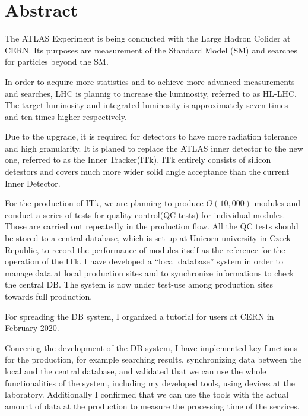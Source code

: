 \chapter*{Abstract}

The ATLAS Experiment is being conducted with the Large Hadron Colider at CERN. Its purposes are measurement of the Standard Model (SM) and searches for particles beyond the SM.

In order to acquire more statistics and to achieve more advanced measurements and searches, LHC is plannig to increase the luminosity, referred to as HL-LHC.
The target luminosity and integrated luminosity is approximately seven times and ten times higher respectively.

Due to the upgrade, it is required for detectors to have more radiation tolerance and high granularity. 
It is planed to replace the ATLAS inner detector to the new one, referred to as the Inner Tracker(ITk). 
ITk entirely consists of silicon detestors and covers much more wider solid angle acceptance than the current Inner Detector.

For the production of ITk, we are planning to produce $O(10,000)$ modules and conduct a series of tests for quality control(QC tests) for individual modules. 
Those are carried out repeatedly in the production flow.
All the QC tests should be stored to a central database, which is set up at Unicorn university in Czeck Republic, to record the performance of modules itself as the reference for the operation of the ITk. 
I have developed a ``local database'' system in order to manage data at local production sites and to synchronize informations to check the central DB. The system is now under test-use among production sites towards full production.

For spreading the DB system, I organized a tutorial for users at CERN in February 2020. 

Concering the development of the DB system, I have implemented key functions for the production, for example searching results, synchronizing data between the local and the central database, and validated that we can use the whole functionalities of the system, including my developed tools, using devices at the laboratory. 
Additionally I confirmed that we can use the tools with the actual amount of data at the production to measure the processing time of the services.

